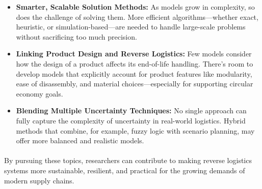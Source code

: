 \begin{itemize}[label=, leftmargin=2mm]
    \item \textbf{Smarter, Scalable Solution Methods:}
        As models grow in complexity, so does the challenge of solving them. More efficient algorithms—whether exact, heuristic, or simulation-based—are needed to handle large-scale problems without sacrificing too much precision.
    
    \item \textbf{Linking Product Design and Reverse Logistics:}
        Few models consider how the design of a product affects its end-of-life handling. There’s room to develop models that explicitly account for product features like modularity, ease of disassembly, and material choices—especially for supporting circular economy goals.

    \item \textbf{Blending Multiple Uncertainty Techniques:}
        No single approach can fully capture the complexity of uncertainty in real-world logistics. Hybrid methods that combine, for example, fuzzy logic with scenario planning, may offer more balanced and realistic models.
\end{itemize}

\paragraph{} By pursuing these topics, researchers can contribute to making reverse logistics systems more sustainable, resilient, and practical for the growing demands of modern supply chains.